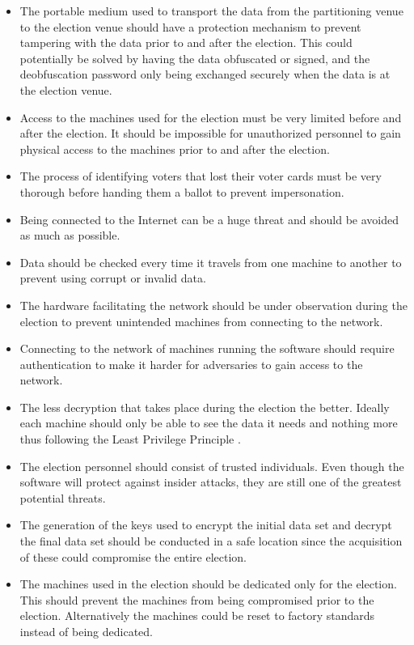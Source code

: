 \documentclass[a4paper]{report}
\begin{document}
\begin{itemize}
\item The portable medium used to transport the data from the partitioning venue to the election venue should have a protection mechanism to prevent tampering with the data prior to and after the election. This could potentially be solved by having the data obfuscated or signed, and the deobfuscation password only being exchanged securely when the data is at the election venue.
\item Access to the machines used for the election must be very limited before and after the election. It should be impossible for unauthorized personnel to gain physical access to the machines prior to and after the election.
\item The process of identifying voters that lost their voter cards must be very thorough before handing them a ballot to prevent impersonation.
\item Being connected to the Internet can be a huge threat and should be avoided as much as possible.
\item Data should be checked every time it travels from one machine to another to prevent using corrupt or invalid data.
\item The hardware facilitating the network should be under observation during the election to prevent unintended machines from connecting to the network.
\item Connecting to the network of machines running the software should require authentication to make it harder for adversaries to gain access to the network.
\item The less decryption that takes place during the election the better. Ideally each machine should only be able to see the data it needs and nothing more thus following the Least Privilege Principle \cite{basin}.
\item The election personnel should consist of trusted individuals. Even though the software will protect against insider attacks, they are still one of the greatest potential threats.
\item The generation of the keys used to encrypt the initial data set and decrypt the final data set should be conducted in a safe location since the acquisition of these could compromise the entire election.
\item The machines used in the election should be dedicated only for the election. This should prevent the machines from being compromised prior to the election. Alternatively the machines could be reset to factory standards instead of being dedicated. 
\end{itemize}
\end{document}
